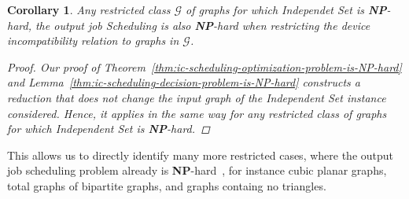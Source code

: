 \documentclass{article}
\newtheorem{mycor}{Corollary}
\begin{document}
\begin{mycor}
Any restricted class $\mathcal{G}$ of graphs for which {\sc Independet Set} is {\bf NP}-hard,  the {\sc output job Scheduling}  is  also {\bf NP}-hard when restricting the device incompatibility relation to graphs in $\mathcal{G}$. 
\begin{proof}
Our proof of Theorem~\ref{thm:ic-scheduling-optimization-problem-is-NP-hard} and Lemma~\ref{thm:ic-scheduling-decision-problem-is-NP-hard} constructs a reduction that does not change the input graph of the {\sc Independent Set} instance considered. Hence, it applies in the same way for any restricted class of graphs for which {\sc Independent Set} is {\bf NP}-hard.
\end{proof}
\end{mycor}

This allows us to directly identify many more restricted cases, where the output job scheduling problem already is {\bf NP}-hard~\cite{GareyJohnson:CI:1979}, for instance cubic planar graphs, total graphs of bipartite graphs, and graphs containg no triangles.





\end{document}
